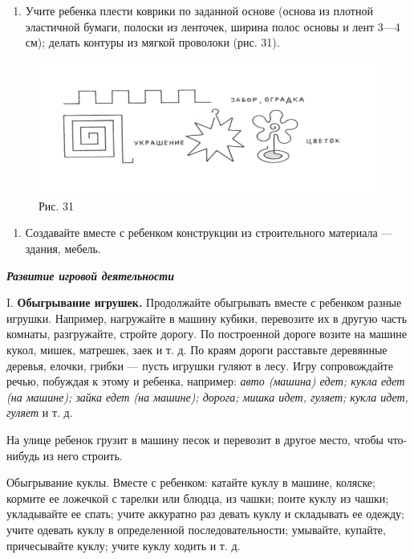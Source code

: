 \documentclass[a5paper]{book}
\renewcommand{\emph}[1]{\textit{#1}}
\begin{document}
\begin{enumerate}
\def\labelenumi{\arabic{enumi}.}
\setcounter{enumi}{6}
\item
  
  Учите ребенка плести коврики по заданной основе (основа из плотной
  эластичной бумаги, полоски из ленточек, ширина полос основы и лент
  3---4 см); делать контуры из мягкой проволоки (рис. 31).
  
\end{enumerate}


\begin{figure}
\centering
\includegraphics[width=\linewidth]{media/media/image28.png}
\caption*{Рис. 31}
\end{figure}


\begin{enumerate}
\def\labelenumi{\arabic{enumi}.}
\setcounter{enumi}{7}
\item
  
  Создавайте вместе с ребенком конструкции из строительного материала
  --- здания, мебель.
  
\end{enumerate}


\emph{\textbf{Развитие игровой деятельности}}

I. \textbf{Обыгрывание игрушек.} Продолжайте обыгрывать вместе с
ребенком разные игрушки. Например, нагружайте в машину кубики,
перевозите их в другую часть комнаты, разгружайте, стройте дорогу. По
построенной дороге возите на машине кукол, мишек, матрешек, заек и т. д.
По краям дороги расставьте деревянные деревья, елочки, грибки --- пусть
игрушки гуляют в лесу. Игру сопровождайте речью, побуждая к этому и
ребенка, например: \emph{авто (машина) едет; кукла едет (на машине);
зайка едет (на машине); дорога; мишка идет, гуляет; кукла идет, гуляет}
и т. д.

На улице ребенок грузит в машину песок и перевозит в другое место, чтобы
что-нибудь из него строить.

Обыгрывание куклы. Вместе с ребенком: катайте куклу в машине, коляске;
кормите ее ложечкой с тарелки или блюдца, из чашки; поите куклу из
чашки; укладывайте ее спать; учите аккуратно раз девать куклу и
складывать ее одежду; учите одевать куклу в определенной
последовательности; умывайте, купайте, причесывайте куклу; учите куклу
ходить и т. д.
\end{document}
